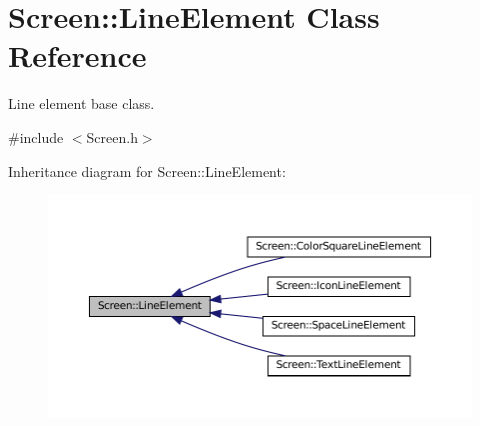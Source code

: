 \hypertarget{classScreen_1_1LineElement}{}\section{Screen\+:\+:Line\+Element Class Reference}
\label{classScreen_1_1LineElement}


Line element base class.  




{\ttfamily \#include $<$Screen.\+h$>$}



Inheritance diagram for Screen\+:\+:Line\+Element\+:\nopagebreak
\begin{figure}[H]
\begin{center}
\leavevmode
\includegraphics[width=350pt]{classScreen_1_1LineElement__inherit__graph}
\end{center}
\end{figure}
